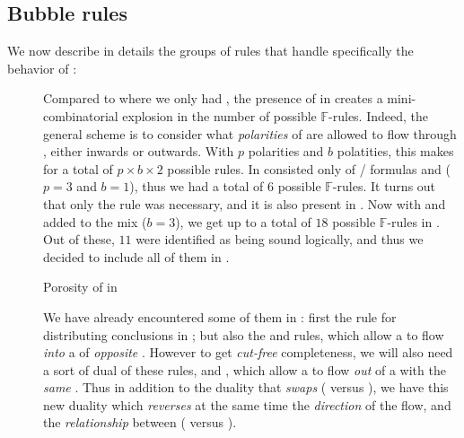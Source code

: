 \subsection{Bubble rules}

We now describe in details the groups of rules that handle specifically the
behavior of :

\begin{description}
  \item[\textbf{\flow}]

  Compared to  where we only had  , the presence of
    in  creates a mini-combinatorial
  explosion in the number of possible $\mathbb{F}$-rules. Indeed, the general
  scheme is to consider what \emph{polarities} of  are allowed to flow
  through , either inwards or outwards. With $p$  polarities and
  $b$  polatities, this makes for a total of $p \times b \times 2$
  possible rules. In   consisted only of
  / formulas and   ($p = 3$
  and $b = 1$), thus we had a total of $6$ possible $\mathbb{F}$-rules. It turns
  out that only the  rule was necessary, and it is also present in
  . Now with  and   added to
  the mix ($b = 3$), we get up to a total of $18$ possible $\mathbb{F}$-rules in
  . Out of these, $11$ were identified as being sound logically,
  and thus we decided to include all of them in .

  \begin{marginfigure}
    \caption{Porosity of  in }
  \end{marginfigure}
  
  We have already encountered some of them in : first the
   rule for distributing conclusions in ; but also
  the  and  rules, which allow a
    to flow \emph{into} a  of \emph{opposite}
  . However to get \emph{cut-free} completeness, we will also need
  a sort of dual of these rules,  and , which
  allow a   to flow \emph{out} of a  with the
  \emph{same} . Thus in addition to the duality that \emph{swaps}
   ( versus ), we have this new
  duality which \emph{reverses} at the same time the \emph{direction} of the
  flow, and the \emph{relationship} between  (
  versus ).


\end{description}
